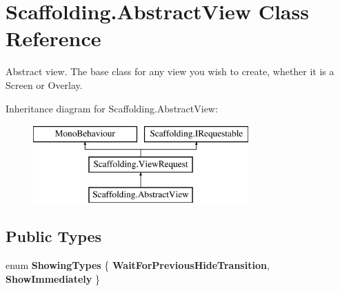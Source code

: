 \hypertarget{class_scaffolding_1_1_abstract_view}{\section{Scaffolding.\+Abstract\+View Class Reference}
\label{class_scaffolding_1_1_abstract_view}
}


Abstract view. The base class for any view you wish to create, whether it is a Screen or Overlay.  


Inheritance diagram for Scaffolding.\+Abstract\+View\+:\begin{figure}[H]
\begin{center}
\leavevmode
\includegraphics[height=3.000000cm]{class_scaffolding_1_1_abstract_view}
\end{center}
\end{figure}
\subsection*{Public Types}
\begin{DoxyCompactItemize}
\item 
\hypertarget{class_scaffolding_1_1_abstract_view_a809162c7410e4929fd9e3f91c9e2e96c}{enum {\bfseries Showing\+Types} \{ {\bfseries Wait\+For\+Previous\+Hide\+Transition}, 
{\bfseries Show\+Immediately}
 \}}\label{class_scaffolding_1_1_abstract_view_a809162c7410e4929fd9e3f91c9e2e96c}

\end{DoxyCompactItemize}

